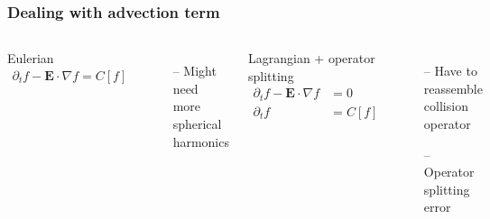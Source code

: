 \documentclass[mathserif, aspectratio=169]{beamer}
\newcommand{\vect}[1]{\boldsymbol{#1}}
\newcommand{\of}[1]{\mleft( #1 \mright)}
\begin{document}
\begin{frame}
\frametitle{Dealing with advection term}

\begin{columns}
Eulerian
\begin{align*}
\partial_t f - \vect{E}\cdot \nabla f = C[f]
\\
\end{align*}
\begin{itemize}
\item[--] Might need more spherical harmonics
\end{itemize}
Lagrangian + operator splitting %
\begin{align*}
\partial_t f - \vect{E}\cdot \nabla f &= 0 
\\
\partial_t f  &= C[f]
\end{align*}
\begin{itemize}
\item[--] Have to reassemble collision operator
\item[--] Operator splitting error
\end{itemize}
\end{columns}
\end{frame}

\end{document}
